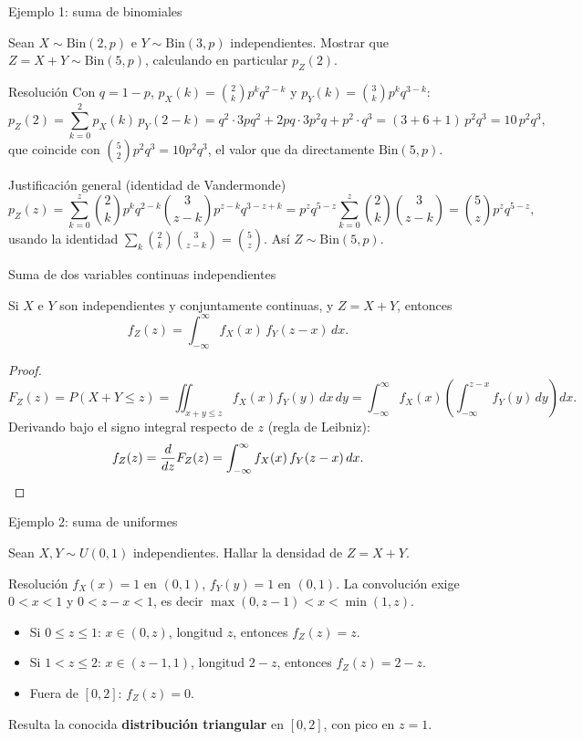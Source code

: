 \documentclass[aspectratio=169,11pt]{beamer}
\begin{document}
\begin{frame}{Ejemplo 1: suma de binomiales}
\begin{example}
Sean $X\sim\text{Bin}(2,p)$ e $Y\sim\text{Bin}(3,p)$ independientes. Mostrar que $Z=X+Y\sim\text{Bin}(5,p)$, calculando en particular $p_Z(2)$.
\end{example}
\pause
\begin{block}{Resolución}
Con $q=1-p$, $p_X(k)=\binom{2}{k}p^k q^{2-k}$ y $p_Y(k)=\binom{3}{k}p^k q^{3-k}$:
\[
p_Z(2) = \sum_{k=0}^{2} p_X(k)\,p_Y(2-k) = q^2\cdot 3pq^2 + 2pq\cdot 3p^2q + p^2\cdot q^3 = (3+6+1)\,p^2q^3 = 10\,p^2q^3,
\]
que coincide con $\binom{5}{2}p^2q^3=10p^2q^3$, el valor que da directamente $\text{Bin}(5,p)$.
\end{block}
\pause
\begin{block}{Justificación general (identidad de Vandermonde)}
\[
p_Z(z) = \sum_{k=0}^{z}\binom{2}{k}p^kq^{2-k}\binom{3}{z-k}p^{z-k}q^{3-z+k} = p^zq^{5-z}\sum_{k=0}^{z}\binom{2}{k}\binom{3}{z-k} = \binom{5}{z}p^zq^{5-z},
\]
usando la identidad $\sum_k \binom{2}{k}\binom{3}{z-k}=\binom{5}{z}$. Así $Z\sim\text{Bin}(5,p)$.
\end{block}
\end{frame}

\begin{frame}{Suma de dos variables continuas independientes}
\begin{theorem}
Si $X$ e $Y$ son independientes y conjuntamente continuas, y $Z=X+Y$, entonces
\[
f_Z(z) = \int_{-\infty}^{\infty} f_X(x)\, f_Y(z-x)\, dx.
\]
\end{theorem}
\begin{proof}
\[
F_Z(z) = P(X+Y\le z) = \iint_{x+y\le z} f_X(x)f_Y(y)\,dx\,dy = \int_{-\infty}^{\infty} f_X(x) \left(\int_{-\infty}^{z-x} f_Y(y)\,dy\right) dx.
\]
Derivando bajo el signo integral respecto de $z$ (regla de Leibniz):
\[
f_Z(z) = \frac{d}{dz}F_Z(z) = \int_{-\infty}^{\infty} f_X(x)\, f_Y(z-x)\, dx. \qedhere
\]
\end{proof}
\end{frame}

\begin{frame}{Ejemplo 2: suma de uniformes}
\begin{example}
Sean $X,Y \sim U(0,1)$ independientes. Hallar la densidad de $Z=X+Y$.
\end{example}
\pause
\begin{block}{Resolución}
$f_X(x)=1$ en $(0,1)$, $f_Y(y)=1$ en $(0,1)$. La convolución exige $0<x<1$ y $0<z-x<1$, es decir $\max(0,z-1) < x < \min(1,z)$.
\begin{itemize}
\item Si $0\le z \le 1$: $x\in(0,z)$, longitud $z$, entonces $f_Z(z)=z$.
\item Si $1< z\le 2$: $x\in(z-1,1)$, longitud $2-z$, entonces $f_Z(z)=2-z$.
\item Fuera de $[0,2]$: $f_Z(z)=0$.
\end{itemize}
Resulta la conocida \textbf{distribución triangular} en $[0,2]$, con pico en $z=1$.
\end{block}
\end{frame}
\end{document}
